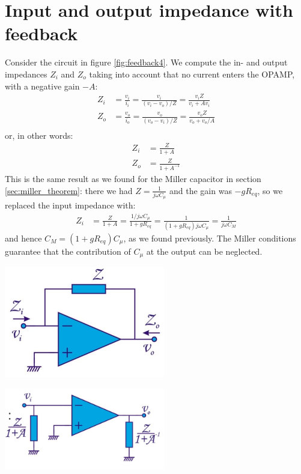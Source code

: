 \section{Input and output impedance with feedback}
\label{sec:impedance_feedback}
Consider the circuit in figure \ref{fig:feedback4}. We compute the in- and output impedances $Z_i$ and $Z_o$ taking into account that no current enters the OPAMP, with a negative gain $-A$:
\begin{align*}
	Z_i &= \frac{v_i}{i_i} = \frac{v_i}{(v_i - v_o)/Z} = \frac{v_i Z}{v_i + Av_i} \\
	Z_o &= \frac{v_o}{i_o} = \frac{v_o}{(v_o - v_i)/Z} = \frac{v_o Z}{v_o + v_o/A}\\
\end{align*}
or, in other words:
\begin{align*}
	Z_i &= \frac{Z}{1 + A} \\
	Z_o &= \frac{Z}{1+ A^{-1}}
\end{align*}
This is the same result as we found for the Miller capacitor in section \ref{sec:miller_theorem}: there we had $Z = \frac{1}{j\omega C_\mu}$ and the gain was $-gR_{eq}$, so we replaced the input impedance with:
\begin{align*}
	Z_i &= \frac{Z}{1 + A} = \frac{1/j\omega C_\mu}{1 + gR_{eq}} = \frac{1}{(1 + gR_{eq}) j\omega C_\mu}  = \frac{1}{j\omega C_M} 
\end{align*}
and hence $C_M = (1 + gR_{eq}) C_\mu$, as we found previously. The Miller conditions guarantee that the contribution of $C_\mu$ at the output can be neglected.\\
\begin{minipage}{.5\textwidth}
	\centering
	\includegraphics[width=7cm]{figures/ch10/feedback4.jpg}
	\label{fig:feedback4}
\end{minipage}%
\begin{minipage}{.5\textwidth}
	\centering
	\includegraphics[width=7cm]{figures/ch10/feedback5.jpg}
	\label{fig:feedback5}
\end{minipage}

